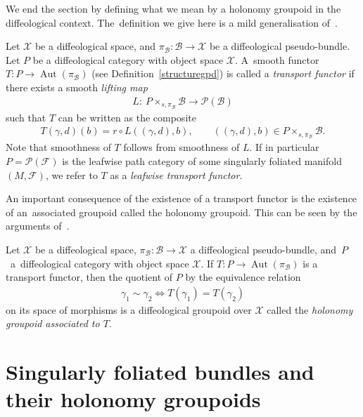 \documentclass[pdftex]{sigma}
\numberwithin{equation}{section}
\def\Aut{\operatorname{Aut}}
\def\FF{{\mathcal{F}}}
\def\BB{{\mathcal{B}}}
\def\PP{{\mathcal{P}}}
\def\XX{{\mathcal{X}}}
\begin{document}
We end the section by defining what we mean by a holonomy groupoid in the diffeological context. The~definition we give here is a mild generalisation of~\cite[Definition~3.26]{mac3}.

\begin{Definition}
Let $\XX$ be a diffeological space, and $\pi_{\BB}\colon \BB\rightarrow \XX$ be a diffeological pseudo-bundle. Let $P$ be a diffeological category with object space $\XX$. A~smooth functor $T\colon P\rightarrow\Aut(\pi_{\BB})$ (see Definition~\ref{structuregpd}) is called a \textit{transport functor} if there exists a smooth \textit{lifting map}
\begin{gather*}
L\colon \ P\times_{s,\pi_{\BB}}\BB\rightarrow\PP(\BB)
\end{gather*}
such that $T$ can be written as the composite
\begin{gather*}
T(\gamma,d)(b) = r\circ L((\gamma,d),b),\qquad ((\gamma,d),b)\in P\times_{s,\pi_{\BB}}\BB.
\end{gather*}
Note that smoothness of $T$ follows from smoothness of $L$. If in particular $P = \PP(\FF)$ is the leafwise path category of some singularly foliated manifold $(M,\FF)$, we refer to $T$ as a \textit{leafwise transport functor}.
\end{Definition}

An important consequence of the existence of a transport functor is the existence of an~asso\-ciated groupoid called the holonomy groupoid. This can be seen by the arguments of~\cite[Pro\-position~3.27]{mac3}.

\begin{Definition}\label{holgpd}
Let $\XX$ be a diffeological space, $\pi_{\BB}\colon \BB\rightarrow \XX$ a diffeological pseudo-bundle, and~$P$~a~diffeological category with object space $\XX$. If $T\colon P\rightarrow\Aut(\pi_{\BB})$ is a transport functor, then the quotient of $P$ by the equivalence relation
\begin{gather*}
\gamma_{1}\sim\gamma_{2}\Leftrightarrow T(\gamma_{1})=T(\gamma_{2})
\end{gather*}
on its space of morphisms is a diffeological groupoid over $\XX$ called the \textit{holonomy groupoid associated to $T$}.
\end{Definition}

\section{Singularly foliated bundles and their holonomy groupoids}\label{sec4}
\end{document}
